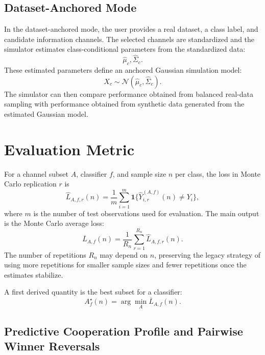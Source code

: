 \documentclass[11pt,a4paper]{article}
\begin{document}
\subsection{Dataset-Anchored Mode}

In the dataset-anchored mode, the user provides a real dataset, a class label, and candidate information channels. The selected channels are standardized and the simulator estimates class-conditional parameters from the standardized data:
\[
    \hat{\mu}_c,\hat{\Sigma}_c.
\]
These estimated parameters define an anchored Gaussian simulation model:
\[
    X_c \sim \mathcal{N}(\hat{\mu}_c,\hat{\Sigma}_c).
\]
The simulator can then compare performance obtained from balanced real-data sampling with performance obtained from synthetic data generated from the estimated Gaussian model.

\section{Evaluation Metric}

For a channel subset $A$, classifier $f$, and sample size $n$ per class, the loss in Monte Carlo replication $r$ is
\[
    \widehat{L}_{A,f,r}(n)
    =
    \frac{1}{m}\sum_{i=1}^{m}
    \mathbf{1}\{\widehat{Y}^{(A,f)}_{i,r}(n)\neq Y_i\},
\]
where $m$ is the number of test observations used for evaluation. The main output is the Monte Carlo average loss:
\[
    \overline{L}_{A,f}(n)
    =
    \frac{1}{R_n}\sum_{r=1}^{R_n}
    \widehat{L}_{A,f,r}(n).
\]
The number of repetitions $R_n$ may depend on $n$, preserving the legacy strategy of using more repetitions for smaller sample sizes and fewer repetitions once the estimates stabilize.

A first derived quantity is the best subset for a classifier:
\[
    A_f^\star(n)=\arg\min_A \overline{L}_{A,f}(n).
\]

\subsection{Predictive Cooperation Profile and Pairwise Winner Reversals}
\end{document}
